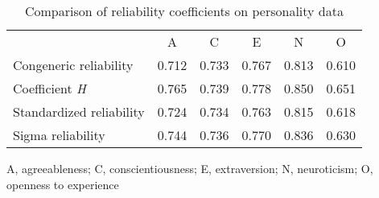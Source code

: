 \begin{table}[ht]
\centering
\caption{Comparison of reliability coefficients on personality data} 
\label{tab:reliabilites}
\begin{tabular}{lccccc}
  & A & C & E & N & O \\ 
 Congeneric reliability & 0.712 & 0.733 & 0.767 & 0.813 & 0.610 \\ 
  Coefficient \it{H} & 0.765 & 0.739 & 0.778 & 0.850 & 0.651 \\ 
  Standardized reliability & 0.724 & 0.734 & 0.763 & 0.815 & 0.618 \\ 
  Sigma reliability & 0.744 & 0.736 & 0.770 & 0.836 & 0.630 \\ 
  \end{tabular}
  \vskip7.0pt
A, agreeableness; C, conscientiousness; E, extraversion; N, neuroticism; O, openness to experience 
\end{table}
